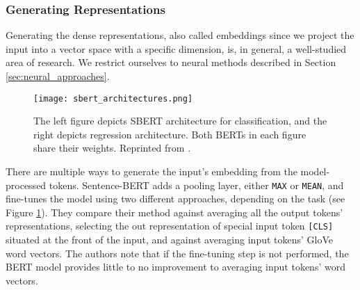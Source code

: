 

\subsubsection{Generating Representations}

Generating the dense representations, also called embeddings since we project the input into a vector space with a specific dimension, is, in general, a well-studied area of research.
We restrict ourselves to neural methods described in Section \ref{sec:neural_approaches}. 

\begin{figure}[!htb]
        \centering
        \texttt{[image: sbert\_architectures.png]}
        \caption[SBERT Architectures]{The left figure depicts SBERT architecture for classification, and the right depicts regression architecture. Both BERTs in each figure share their weights. Reprinted from \citep{sbert}.}
        \label{fig:sbert_architectures}
\end{figure}

There are multiple ways to generate the input's embedding from the model-processed tokens.
Sentence-BERT \citep{sbert} adds a pooling layer, either \texttt{MAX} or \texttt{MEAN}, and fine-tunes the model using two different approaches, depending on the task (see Figure \ref{fig:sbert_architectures}).
They compare their method against averaging all the output tokens' representations, selecting the out representation of special input token \texttt{[CLS]} situated at the front of the input, and against averaging input tokens' GloVe \citep{glove} word vectors.
The authors note that if the fine-tuning step is not performed, the BERT model provides little to no improvement to averaging input tokens' word vectors.

